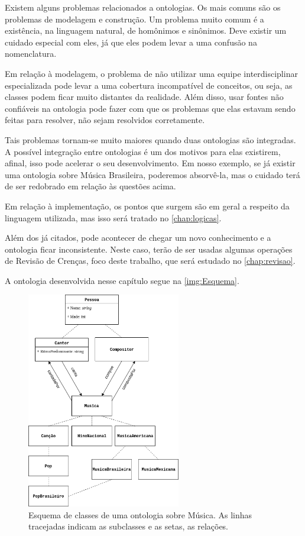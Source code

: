 Existem alguns problemas relacionados a ontologias. Os mais comuns são os problemas de modelagem e construção. Um problema muito comum é a existência, na linguagem natural, de homônimos e sinônimos. Deve existir um cuidado especial com eles, já que eles podem levar a uma confusão na nomenclatura.

Em relação à modelagem, o problema de não utilizar uma equipe interdisciplinar especializada pode levar a uma cobertura incompatível de conceitos, ou seja, as classes podem ficar muito distantes da realidade. Além disso, usar fontes não confiáveis na ontologia pode fazer com que os problemas que elas estavam sendo feitas para resolver, não sejam resolvidos corretamente.

Tais problemas tornam-se muito maiores quando duas ontologias são integradas. A possível integração entre ontologias é um dos motivos para elas existirem, afinal, isso pode acelerar o seu desenvolvimento. Em nosso exemplo, se já existir uma ontologia sobre Música Brasileira, poderemos absorvê-la, mas o cuidado terá de ser redobrado em relação às questões acima. 

Em relação à implementação, os pontos que surgem são em geral a respeito da linguagem utilizada, mas isso será tratado no \autoref{chap:logicas}.

Além dos já citados, pode acontecer de chegar um novo conhecimento e a ontologia ficar inconsistente. Neste caso, terão de ser usadas algumas operações de Revisão de Crenças, foco deste trabalho, que será estudado no \autoref{chap:revisao}.

A ontologia desenvolvida nesse capítulo segue na \autoref{img:Esquema}.

\begin{figure}
	\centering
	\includegraphics[width=0.6\textwidth]{Capitulos/Ontologias/OntologiaMusica}
	\caption{Esquema de classes de uma ontologia sobre Música. As linhas tracejadas indicam as subclasses e as setas, as relações.}
	\label{img:Esquema}
\end{figure}